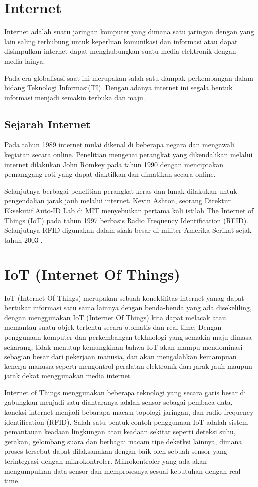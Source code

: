 \section{Internet}
Internet adalah suatu jaringan komputer yang dimana satu jaringan dengan yang lain saling terhubung untuk keperluan komunikasi dan informasi atau dapat disimpulkan internet dapat menghubungkan suatu media elektronik dengan media lainya.

Pada era globalisasi saat ini merupakan salah satu dampak perkembangan dalam bidang Teknologi Informasi(TI). Dengan adanya internet ini segala bentuk informasi menjadi semakin terbuka dan maju.

\subsection{Sejarah Internet}
Pada tahun 1989 internet mulai dikenal di beberapa negara dan mengawali kegiatan secara online.
Penelitian mengenai perangkat yang dikendalikan melalui internet dilakukan John Romkey pada tahun 1990
dengan menciptakan  pemanggang roti yang dapat diaktifkan dan dimatikan secara online.

Selanjutnya berbagai penelitian  perangkat  keras  dan  lunak dilakukan untuk pengendalian jarak jauh melalui internet.
Kevin Ashton, seorang Direktur Eksekutif Auto-ID Lab di MIT menyebutkan pertama kali istilah The Internet of Things (IoT)
pada tahun 1997 berbasis Radio Frequency  Identification (RFID). Selanjutnya  RFID digunakan dalam skala besar di militer
Amerika Serikat sejak tahun 2003 \cite{wilianto2018sejarah}.

\section{IoT (Internet Of Things)}
IoT (Internet Of Things) merupakan sebuah konektifitas internet yanag dapat bertukar informasi
satu sama lainnya dengan benda-benda yang ada disekeliling, dengan menggunakan IoT (Internet Of Things) kita dapat melacak atau memantau suatu objek tertentu secara otomatis dan real time.
Dengan penggunaan komputer dan perkembangan tekhnologi yang semakin maju dimasa sekarang, tidak menutup kemungkinan bahwa IoT akan mampu mendominasi sebagian besar dari pekerjaan manusia, dan akan mengalahkan kemampuan kenerja manusia seperti mengontrol peralatan
elektronik dari jarak jauh maupun jarak dekat menggunakan media internet.

Internet of Things menggunakan beberapa teknologi yang secara garis besar di gabungkan
menjadi satu diantaranya adalah sensor sebagai pembaca data, koneksi internet menjadi bebarapa macam topologi jaringan,
dan radio frequency identification (RFID). Salah satu bentuk contoh penggunaan IoT adalah sistem pemantauan
keadaan lingkungan atau keadaan sekitar seperti deteksi suhu, gerakan, gelombang suara
dan berbagai macam tipe deketksi lainnya, dimana proses tersebut dapat dilaksanakan dengan baik oleh sebuah sensor yang
terintegrasi dengan mikrokontroler. Mikrokontroler yang ada akan mengumpulkan data sensor dan memprosesnya sesuai
kebutuhan dengan real time.

